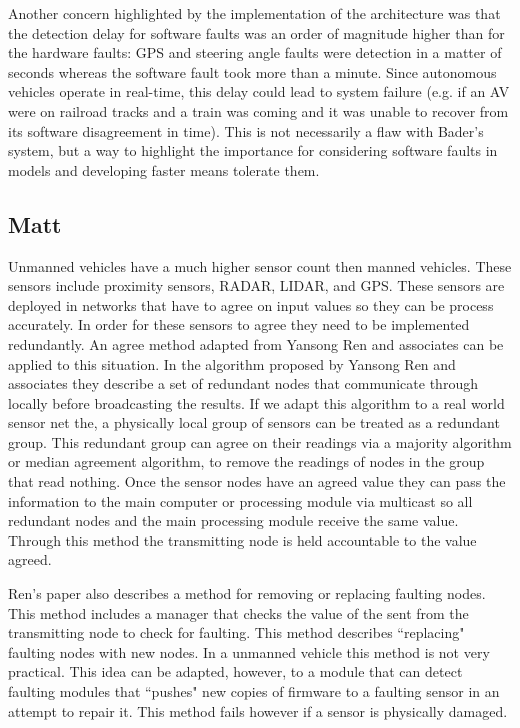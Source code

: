 \documentclass[twoside, conference]{IEEEtran}
\begin{document}
Another concern highlighted by the implementation of the architecture was that the detection delay for software faults was an order of magnitude higher than for the hardware faults: GPS and steering angle faults were detection in a matter of seconds whereas the software fault took more than a minute. Since autonomous vehicles operate in real-time, this delay could lead to system failure (e.g. if an AV were on railroad tracks and a train was coming and it was unable to recover from its software disagreement in time). This is not necessarily a flaw with Bader's system, but a way to highlight the importance for considering software faults in models and developing faster means tolerate them. \cite{Bader2014}

\subsection{Matt}
Unmanned vehicles have a much higher sensor count then manned vehicles. These sensors include proximity sensors, RADAR, LIDAR, and GPS. These sensors are deployed in networks that have to agree on input values so they can be process accurately. In order for these sensors to agree they need to be implemented redundantly. An agree method adapted from Yansong Ren and associates can be applied to this situation. In the algorithm proposed by Yansong Ren and associates they describe a set of redundant nodes that communicate through locally before broadcasting the results. If we adapt this algorithm to a real world sensor net the, a physically local group of sensors can be treated as a redundant group. This redundant group can agree on their readings via a majority algorithm or median agreement algorithm, to remove the readings of nodes in the group that read nothing. Once the sensor nodes have an agreed value they can pass the information to the main computer or processing module via multicast so all redundant nodes and the main processing module receive the same value. Through this method the transmitting node is held accountable to the value agreed.\cite{Ren2001}

Ren's paper also describes a method for removing or replacing faulting nodes. This method includes a manager that checks the value of the sent from the transmitting node to check for faulting. This method describes ``replacing" faulting nodes with new nodes. In a unmanned vehicle this method is not very practical. This idea can be adapted, however, to a module that can detect faulting modules that ``pushes" new copies of firmware to a faulting sensor in an attempt to repair it. This method fails however if a sensor is physically damaged.\cite{Ren2001}
\end{document}
